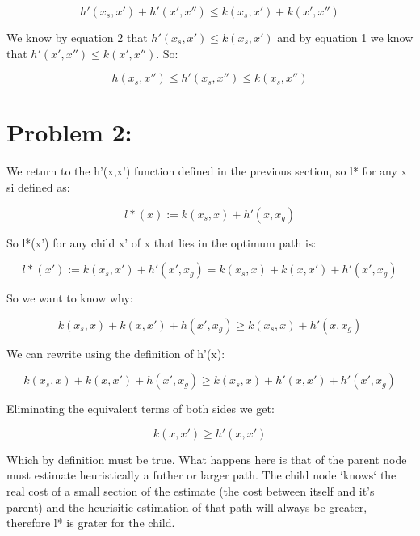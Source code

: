 \documentclass{article}
\begin{document}
\[ h'(x_s,x') + h'(x',x'') \leq k(x_s,x') + k(x',x'') \]

We know by equation 2 that $h'(x_s,x') \leq k(x_s,x')$ and by equation 1 we know that $h'(x',x'') \leq k(x',x'')$. So:

\begin{equation}

  h(x_s,x'') \leq h'(x_s,x'') \leq k(x_s,x'')

\end{equation}

\section{Problem 2:}

We return to the h'(x,x') function defined in the previous section, so l* for any x si defined as:

\[ l*(x):=k(x_s,x)+h'(x,x_g) \]

So l*(x') for any child x' of x that lies in the optimum path is:

\[ l*(x'):=k(x_s,x')+h'(x',x_g)=k(x_s,x)+k(x,x')+h'(x',x_g) \]

So we want to know why:

\[k(x_s,x)+k(x,x')+h(x',x_g) \ge k(x_s,x)+h'(x,x_g) \]

We can rewrite using the definition of h'(x):

\[k(x_s,x)+k(x,x')+h(x',x_g) \ge k(x_s,x)+h'(x,x')+h'(x',x_g) \]

Eliminating the equivalent terms of both sides we get:

\[k(x,x') \ge h'(x,x') \]

Which by definition must be true. What happens here is that of the parent node must estimate heuristically a futher or larger path. The child node `knows` the real cost of a small section of the estimate (the cost between itself and it's parent) and the heurisitic estimation of that path will always be greater, therefore l* is grater for the child.
\end{document}
